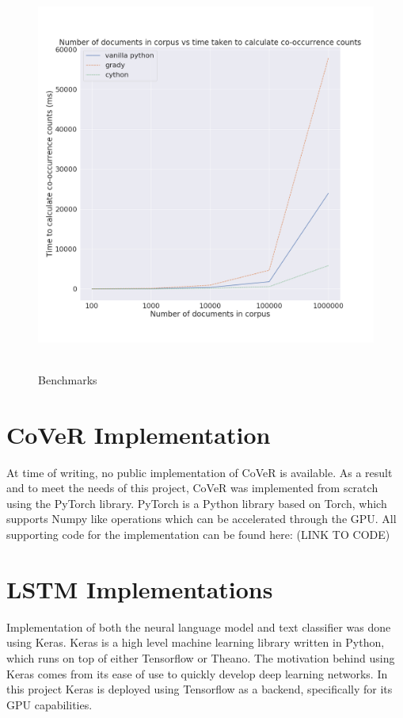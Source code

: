 \begin{figure}[ht]
	\includegraphics[width=13cm, height=13cm]{./figures/fig15}
	\centering
	\caption[Co-occurrence benchmarks]{Benchmarks}
	\label{fig:fig15}
\end{figure}

\noindent
\newline
\section{CoVeR Implementation}
At time of writing, no public implementation of CoVeR is available. As a result and to meet the needs of this project, CoVeR was implemented from scratch using the PyTorch library. PyTorch is a Python library based on Torch, which supports Numpy like operations which can be accelerated through the GPU. All supporting code for the implementation can be found here: (LINK TO CODE)

\section{LSTM Implementations}
Implementation of both the neural language model and text classifier was done using Keras. Keras is a high level machine learning library written in Python, which runs on top of either Tensorflow or Theano. The motivation behind using Keras comes from its ease of use to quickly develop deep learning networks. In this project Keras is deployed using Tensorflow as a backend, specifically for its GPU capabilities.
